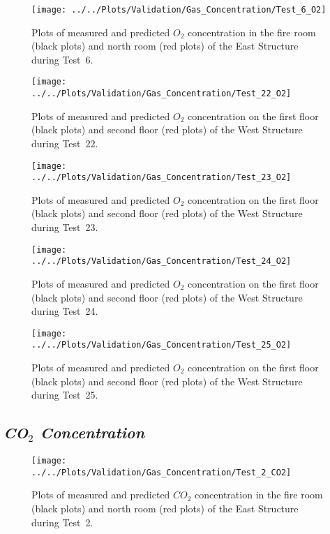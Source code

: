 \begin{figure}[!h]
	\centering
	\texttt{[image: ../../Plots/Validation/Gas\_Concentration/Test\_6\_O2]}
	\caption[Plots of measured and predicted $O_2$ concentration during Test~6.]{Plots of measured and predicted $O_2$ concentration in the fire room (black plots) and north room (red plots) of the East Structure during Test~6.}
	\label{fig:Test6_O2}
\end{figure}

\begin{figure}[!h]
	\centering
	\texttt{[image: ../../Plots/Validation/Gas\_Concentration/Test\_22\_O2]}
	\caption[Plots of measured and predicted $O_2$ concentration during Test~22.]{Plots of measured and predicted $O_2$ concentration on the first floor (black plots) and second floor (red plots) of the West Structure during Test~22.}
	\label{fig:Test22_O2}
\end{figure}

\begin{figure}[!h]
	\centering
	\texttt{[image: ../../Plots/Validation/Gas\_Concentration/Test\_23\_O2]}
	\caption[Plots of measured and predicted $O_2$ concentration during Test~23.]{Plots of measured and predicted $O_2$ concentration on the first floor (black plots) and second floor (red plots) of the West Structure during Test~23.}
	\label{fig:Test23_O2}
\end{figure}

\begin{figure}[!h]
	\centering
	\texttt{[image: ../../Plots/Validation/Gas\_Concentration/Test\_24\_O2]}
	\caption[Plots of measured and predicted $O_2$ concentration during Test~24.]{Plots of measured and predicted $O_2$ concentration on the first floor (black plots) and second floor (red plots) of the West Structure during Test~24.}
	\label{fig:Test24_O2}
\end{figure}

\begin{figure}[!h]
	\centering
	\texttt{[image: ../../Plots/Validation/Gas\_Concentration/Test\_25\_O2]}
	\caption[Plots of measured and predicted $O_2$ concentration during Test~25.]{Plots of measured and predicted $O_2$ concentration on the first floor (black plots) and second floor (red plots) of the West Structure during Test~25.}
	\label{fig:Test25_O2}
\end{figure}

\clearpage
\subsection*{\textit{CO$_2$ Concentration}}
\begin{figure}[!h]
	\centering
	\texttt{[image: ../../Plots/Validation/Gas\_Concentration/Test\_2\_CO2]}
	\caption[Plots of measured and predicted $CO_2$ concentration during Test~2.]{Plots of measured and predicted $CO_2$ concentration in the fire room (black plots) and north room (red plots) of the East Structure during Test~2.}
	\label{fig:Test2_CO2}
\end{figure}

